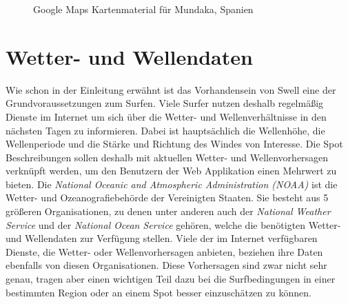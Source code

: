 \begin{figure}[h]
  \caption{Google Maps Kartenmaterial für Mundaka, Spanien}
  \label{google-maps}
\end{figure}

\section{Wetter- und Wellendaten}
\label{sec:Wetter- und Wellendaten}

Wie schon in der Einleitung erwähnt ist das Vorhandensein von Swell
eine der Grundvoraussetzungen zum Surfen. Viele Surfer nutzen deshalb
regelmäßig Dienste im Internet um sich über die Wetter- und
Wellenverhältnisse in den nächsten Tagen zu informieren. Dabei ist
hauptsächlich die Wellenhöhe, die Wellenperiode und die Stärke und
Richtung des Windes von Interesse. Die Spot Beschreibungen sollen
deshalb mit aktuellen Wetter- und Wellenvorhersagen verknüpft werden,
um den Benutzern der Web Applikation einen Mehrwert zu bieten. Die
\textit{National Oceanic and Atmospheric Administration (NOAA)} ist
die Wetter- und Ozeanografiebehörde der Vereinigten Staaten. Sie
besteht aus 5 größeren Organisationen, zu denen unter anderen auch der
\textit{National Weather Service} und der \textit{National Ocean
  Service} gehören, welche die benötigten Wetter- und Wellendaten zur
Verfügung stellen. Viele der im Internet verfügbaren Dienste, die
Wetter- oder Wellenvorhersagen anbieten, beziehen ihre Daten ebenfalls
von diesen Organisationen. Diese Vorhersagen sind zwar nicht sehr
genau, tragen aber einen wichtigen Teil dazu bei die Surfbedingungen
in einer bestimmten Region oder an einem Spot besser einzuschätzen zu
können.

